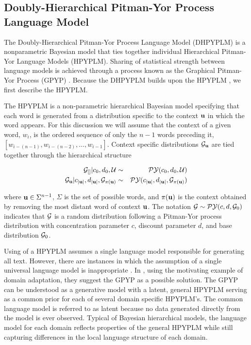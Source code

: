 \subsection{Doubly-Hierarchical Pitman-Yor Process Language Model}

The Doubly-Hierarchical Pitman-Yor Process Language Model (DHPYPLM) \cite{wood and teh} is a nonparametric Bayesian model that ties together individual Hierarchical Pitman-Yor Language Models (HPYPLM). Sharing of statistical strength between language models is achieved through a process known as the Graphical Pitman-Yor Process (GPYP) \cite{wood and teh}.  Because the DHPYPLM builds upon the HPYPLM \cite{teh}, we first describe the HPYPLM.

The HPYPLM is a non-parametric hierarchical Bayesian model specifying that each word is generated from a distribution specific to the context ${\bf u}$ in which the word appears.  For this discussion we will assume that the context of a given word, $w_i$, is the ordered sequence of only the $n-1$ words preceding it, $[w_{i - (n-1)}, w_{i-(n-2)}, \ldots, w_{i-1}]$.  Context specific distributions $\G_{\bu}$ are tied together through the hierarchical structure

\begin{eqnarray}
\G_{[]}| c_0, d_0, \mathcal{U} &\sim& \PY(c_0, d_0, \mathcal{U}) \nonumber \\
\G_\bu | c_{|\bu|}, d_{|\bu|}, \G_{\pi (\bu)} &\sim& \PY( c_{|\bu|}, d_{|\bu|},  \G_{\pi (\bu)}) \label{eqn:hpyplm}
\end{eqnarray}

where $\bu \in \Sigma^{n-1}$, $\Sigma$ is the set of possible words, and $\pi(\bu)$ is the context obtained by removing the most distant word of context $\bu$.  The notation $\G \sim \PY(c,d,\G_0)$ indicates that $\G$ is a random distribution following a Pitman-Yor process \cite{someone} distribution with concentration parameter $c$, discount parameter $d$, and base distribution $\G_0$.

Using of a HPYPLM assumes a single language model responsible for generating all text.  However, there are instances in which the assumption of a single universal language model is inappropriate \cite{Rosenfeld2000}.  In \cite{wood and teh}, using the motivating example of domain adaptation, they suggest the GPYP as a possible solution. The GPYP can be understood as a generative model with a latent, general HPYPLM serving as a common prior for each of several domain specific HPYPLM's.  The common language model is referred to as latent because no data generated directly from the model is ever observed.  Typical of Bayesian hierarchical models, the language model for each domain reflects properties of the general HPYPLM while still capturing differences in the local language structure of each domain.  

